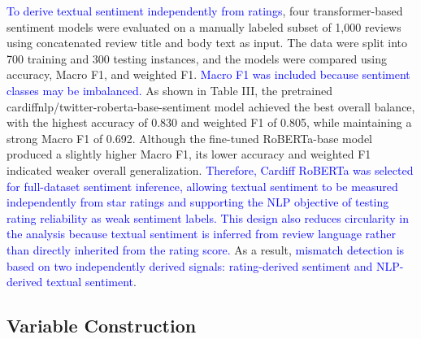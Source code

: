 \documentclass[conference]{IEEEtran}
\newcommand{\changed}[1]{\textcolor{blue}{#1}}
\begin{document}
\changed{To derive textual sentiment independently from ratings}, four transformer-based sentiment models were evaluated on a manually labeled subset of 1,000 reviews using concatenated review title and body text as input. The data were split into 700 training and 300 testing instances, and the models were compared using accuracy, Macro F1, and weighted F1. \changed{Macro F1 was included because sentiment classes may be imbalanced.} As shown in Table III, the pretrained cardiffnlp/twitter-roberta-base-sentiment model achieved the best overall balance, with the highest accuracy of 0.830 and weighted F1 of 0.805, while maintaining a strong Macro F1 of 0.692. Although the fine-tuned RoBERTa-base model produced a slightly higher Macro F1, its lower accuracy and weighted F1 indicated weaker overall generalization. \changed{Therefore, Cardiff RoBERTa was selected for full-dataset sentiment inference, allowing textual sentiment to be measured independently from star ratings and supporting the NLP objective of testing rating reliability as weak sentiment labels.} \changed{This design also reduces circularity in the analysis because textual sentiment is inferred from review language rather than directly inherited from the rating score.} As a result, \changed{mismatch detection is based on two independently derived signals: rating-derived sentiment and NLP-derived textual sentiment}.
\begin{table}[htbp]
\caption{Sentiment Model Performance (Test Set, $n = 300$)}
\label{tab:sentiment_performance}
\centering
{}
\end{table}

\subsection{Variable Construction}
\end{document}
